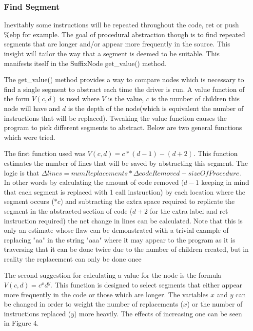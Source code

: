 \documentclass[9pt,nocopyrightspace]{sigplanconf}
\begin{document}
\subsubsection{Find Segment}

Inevitably some instructions will be repeated throughout the code, ret or push \%ebp for example.
The goal of procedural abstraction though is to find repeated segments that are longer and/or appear more frequently in the source.
This insight will tailor the way that a segment is deemed to be suitable.
This manifests itself in the SuffixNode get\_value() method.

The get\_value() method provides a way to compare nodes which is necessary to find a single segment to abstract each time the driver is run.
A value function of the form $V(c,d)$ is used where $V$ is the value, $c$ is the number of children this node will have and $d$ is the depth of the node(which is equivalent the number of instructions that will be replaced).
Tweaking the value function causes the program to pick different segments to abstract.
Below are two general functions which were tried.

The first function used was $V(c,d)=c*(d-1)-(d+2)$.
This function estimates the number of lines that will be saved by abstracting this segment.
The logic is that $\Delta lines=numReplacements*\Delta codeRemoved - sizeOfProcedure$.
In other words by calculating the amount of code removed ($d-1$ keeping in mind that each segment is replaced with 1 call instruction) by each location where the segment occurs ($*c$) and subtracting the extra space required to replicate the segment in the abstracted section of code ($d+2$ for the extra label and ret instruction required) the net change in lines can be calculated.
Note that this is only an estimate whose flaw can be demonstrated with a trivial example of replacing "aa" in the string "aaa" where it may appear to the program as it is traversing that it can be done twice due to the number of children created, but in reality the replacement can only be done once

The second suggestion for calculating a value for the node is the formula $V(c,d)=c^{x}d^{y}$.
This function is designed to select segments that either appear more frequently in the code or those which are longer.
The variables $x$ and $y$ can be changed in order to weight the number of replacements ($x$) or the number of instructions replaced ($y$) more heavily.
The effects of increasing one can be seen in Figure 4.
\end{document}
